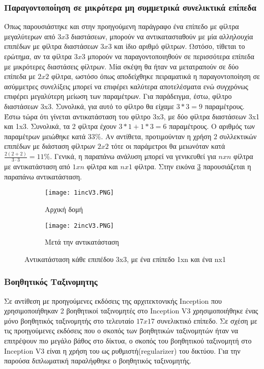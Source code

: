 \subsubsection{Παραγοντοποίηση σε μικρότερα μη συμμετρικά συνελικτικά επίπεδα}
\label{subsubsec:3.3.2.2}
Όπως παρουσιάστηκε και στην προηγούμενη παράγραφο ένα επίπεδο με φίλτρα μεγαλύτερων από $3x3$ διαστάσεων, μπορούν να αντικατασταθούν με μία  
αλληλουχία  επιπέδων με φίλτρα διαστάσεων $3x3$ και ίδιο αριθμό φίλτρων. Ωστόσο, τίθεται το ερώτημα, αν τα φίλτρα $3x3$ μπορούν να παραγοντοποιηθούν σε περισσότερα επίπεδα με μικρότερες διαστάσεις φίλτρων. Μία σκέψη θα ήταν να μετατραπούν σε δύο επίπεδα με $2x2$ φίλτρα, ωστόσο όπως αποδείχθηκε πειραματικά η παραγοντοποίηση σε ασύμμετρες συνελίξεις μπορεί να επιφέρει καλύτερα αποτελέσματα ενώ συγχρόνως επιφέρει μεγαλύτερη μείωση των παραμέτρων. Για παράδειγμα, έστω, φίλτρο διαστάσεων 3x3. Συνολικά, για αυτό το φίλτρο θα είχαμε $3*3 = 9$ παραμέτρους. Έστω τώρα ότι γίνεται αντικατάσταση του φίλτρο 3x3, με δύο φίλτρα  διαστάσεων 3x1 και 1x3. Συνολικά, τα 2 φίλτρα έχουν $3*1 + 1*3 = 6$ παραμέτρους. Ο αριθμός των παραμέτρων μειώθηκε κατά $33\%$. Αν αντίθετα, προτιμούνταν η χρήση $2$ συλλεκτικών επιπέδων με διάσταση φίλτρων $2x2$ τότε οι παράμετροι θα μειωνόταν κατά $\frac{2(2+2)}{3 \cdot 3}= 11\%$. Γενικά, η παραπάνω ανάλυση μπορεί να γενικευθεί για $nxn$ φίλτρα με αντικατάσταση από $1xn$ φίλτρα και $nx1$ φίλτρα. Στην εικόνα  \ref{figure:b2} παρουσιάζεται η παραπάνω αντικατάσταση.


\begin{figure}[!h]
\centering
\begin{subfigure}{.5\textwidth}
  \centering
  \texttt{[image: 1incV3.PNG]}
  \caption{Αρχική δομή}
  \label{fig:sub1b2}
\end{subfigure}
\begin{subfigure}{.5\textwidth}
  \centering
  \texttt{[image: 2incV3.PNG]}
  \caption{Μετά την αντικατάσταση}
  \label{fig:sub2b2}
\end{subfigure}
\caption{Αντικατάσταση κάθε επιπέδου 3x3, με ένα επίπεδο 1xn και ένα nx1}
\label{figure:b2}
\end{figure}


\subsubsection{Βοηθητικός Ταξινομητης}
\label{subsubsec:3.3.2.3}
Σε αντίθεση με προηγούμενες εκδόσεις της αρχιτεκτονικής Inception που χρησιμοποιήθηκαν 2 βοηθητικοί ταξινομητές στο Inception V3 χρησιμοποιήθηκε ένας μόνο βοηθητικός ταξινομητής στο τελευταίο $17x17$ συνελικτικό επίπεδο. Σε σχέση με τις προηγούμενες εκδόσεις που ο σκοπός των βοηθητικών ταξινομητών ήταν να επιτρέψουν πιο μεγάλο βάθος στο δίκτυα, ο σκοπός του βοηθητικού ταξινομητή στο Inception V3 είναι η χρήση του ως ρυθμιστή(regularizer) του δικτύου. Για την παρούσα διπλωματική παραλήφθηκε ο βοηθητικός ταξινομητής.


